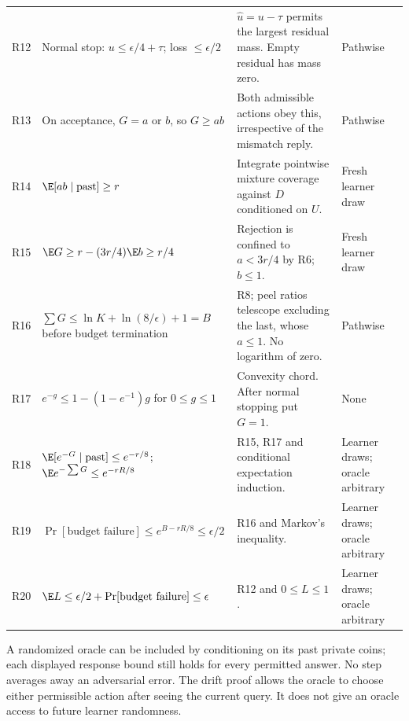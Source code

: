\begin{longtable}{@{}p{.6cm}p{6.2cm}p{4.9cm}>{\raggedright\arraybackslash}p{2.4cm}@{}}
R12 & Normal stop: $u\le\epsilon/4+\tau$; loss $\le\epsilon/2$ & $\widehat u=u-\tau$ permits the largest residual mass. Empty residual has mass zero. & Pathwise\\
R13 & On acceptance, $G=a$ or $b$, so $G\ge ab$ & Both admissible actions obey this, irrespective of the mismatch reply. & Pathwise\\
R14 & $\E[ab\mid\text{past}]\ge r$ & Integrate pointwise mixture coverage against $D$ conditioned on $U$. & Fresh learner draw\\
R15 & $\E G\ge r-(3r/4)\E b\ge r/4$ & Rejection is confined to $a<3r/4$ by R6; $b\le1$. & Fresh learner draw\\
R16 & $\sum G\le\ln K+\ln(8/\epsilon)+1=B$ before budget termination & R8; peel ratios telescope excluding the last, whose $a\le1$. No logarithm of zero. & Pathwise\\
R17 & $e^{-g}\le1-(1-e^{-1})g$ for $0\le g\le1$ & Convexity chord. After normal stopping put $G=1$. & None\\
R18 & $\E[e^{-G}\mid\text{past}]\le e^{-r/8}$; $\E e^{-\sum G}\le e^{-rR/8}$ & R15, R17 and conditional expectation induction. & Learner draws; oracle arbitrary\\
R19 & $\Pr[\text{budget failure}]\le e^{B-rR/8}\le\epsilon/2$ & R16 and Markov's inequality. & Learner draws; oracle arbitrary\\
R20 & $\E L\le\epsilon/2+\Pr[\text{budget failure}]\le\epsilon$ & R12 and $0\le L\le1$. & Learner draws; oracle arbitrary\\
\bottomrule
\end{longtable}
\normalsize

A randomized oracle can be included by conditioning on its past private coins; each displayed response bound still holds for every permitted answer. No step averages away an adversarial error. The drift proof allows the oracle to choose either permissible action after seeing the current query. It does not give an oracle access to future learner randomness.

